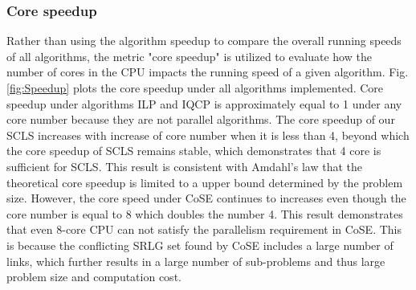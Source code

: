 \subsubsection{Core speedup}
Rather than using the algorithm speedup to compare the overall running speeds of all algorithms, the metric "core speedup" is utilized to evaluate how the number of cores in the CPU impacts the running speed of a given algorithm.
Fig.\ref{fig:Speedup} plots the core speedup under all algorithms implemented.
Core speedup under algorithms ILP and IQCP is  approximately equal to 1 under any core number because they are not parallel algorithms. The core speedup of our SCLS increases with increase of core number when it is less than 4, beyond which the core speedup of SCLS remains stable, which demonstrates that 4 core is sufficient for SCLS. This result is consistent with Amdahl's law \cite{amdahl1967validity} that the theoretical core speedup is limited to a upper bound determined by the problem size. However, the core speed under CoSE continues to increases even though the core number is  equal to 8 which doubles the number 4. This result demonstrates that even 8-core CPU can not satisfy the parallelism requirement in CoSE. This is because the conflicting SRLG set found by CoSE includes  a large number of links,  which further results in a large number of sub-problems  and thus large problem size and  computation cost.


%


